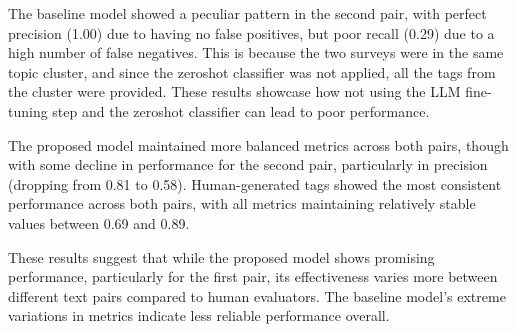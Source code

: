 The baseline model showed a peculiar pattern in the second pair, with perfect precision (1.00) due to having no false positives, but poor recall (0.29) due to a high number of false negatives. This is because the two surveys were in the same topic cluster, and since the zeroshot classifier was not applied, all the tags from the cluster were provided. These results showcase how not using the LLM fine-tuning step and the zeroshot classifier can lead to poor performance.

The proposed model maintained more balanced metrics across both pairs, though with some decline in performance for the second pair, particularly in precision (dropping from 0.81 to 0.58). Human-generated tags showed the most consistent performance across both pairs, with all metrics maintaining relatively stable values between 0.69 and 0.89.

These results suggest that while the proposed model shows promising performance, particularly for the first pair, its effectiveness varies more between different text pairs compared to human evaluators. The baseline model's extreme variations in metrics indicate less reliable performance overall.



